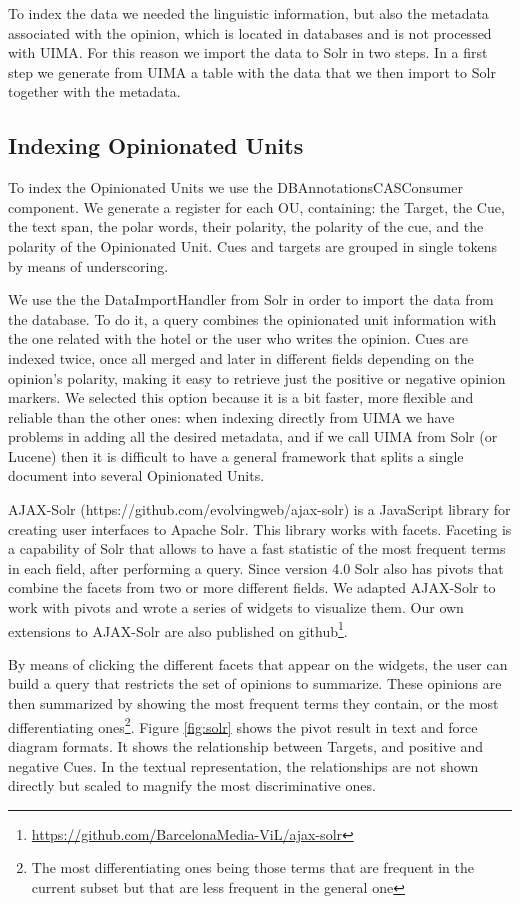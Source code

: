 \documentclass{llncs}
\begin{document}
To index the data we needed the linguistic information, but also the metadata associated with the opinion, which is located in databases and is not processed with UIMA. For this reason we import the data to Solr in two steps. In a first step we generate from UIMA a table with the data that we then import to Solr together with the metadata.

\subsection{Indexing Opinionated Units}

To index the Opinionated Units we use the DBAnnotationsCASConsumer component. We generate a register for each OU, containing: the Target, the Cue, the text span, the polar words, their polarity, the polarity of the cue, and the polarity of the Opinionated Unit. Cues and targets are grouped in single tokens by means of underscoring.

We use the the DataImportHandler from Solr in order to import the data from the database. To do it, a query combines the opinionated unit information with the one related with the hotel or the user who writes the opinion. Cues are indexed twice, once all merged and later in different fields depending on the opinion's polarity, making it easy to retrieve just the positive or negative opinion markers. We selected this option because it is a bit faster, more flexible and reliable than the other ones: when indexing directly from UIMA we have problems in adding all the desired metadata, and if we call UIMA from Solr (or Lucene) then it is difficult to have a general framework that splits a single document into several Opinionated Units.

AJAX-Solr (https://github.com/evolvingweb/ajax-solr) is a JavaScript library for creating user interfaces to Apache Solr. This library works with facets. Faceting is a capability of Solr that allows to have a fast statistic of the most frequent terms in each field, after performing a query. Since version 4.0 Solr also has pivots that combine the facets from two or more different fields. We adapted AJAX-Solr to work with pivots and wrote a series of widgets to visualize them. Our own extensions to AJAX-Solr are also published on github\footnote{\url{https://github.com/BarcelonaMedia-ViL/ajax-solr}}.

By means of clicking the different facets that appear on the widgets, the user can build a query that restricts the set of opinions to summarize. These opinions are then summarized by showing the most frequent terms they contain, or the most differentiating ones\footnote{The most differentiating ones being those terms that are frequent in the current subset but that are less frequent in the general one}. Figure \ref{fig:solr} shows the pivot result in text and force diagram formats. It shows the relationship between Targets, and positive and negative Cues. In the textual representation, the relationships are not shown directly but scaled to magnify the most discriminative ones. 
\end{document}
